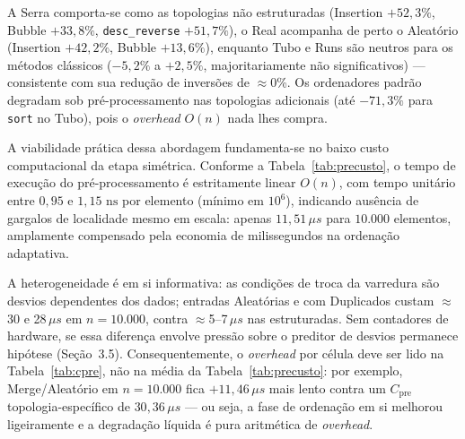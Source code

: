 \documentclass[portuguese]{sbc2025}%
\begin{document}
A Serra comporta-se como as topologias não estruturadas (Insertion $+52{,}3\%$, Bubble $+33{,}8\%$, \texttt{desc\_reverse} $+51{,}7\%$), o Real acompanha de perto o Aleatório (Insertion $+42{,}2\%$, Bubble $+13{,}6\%$), enquanto Tubo e Runs são neutros para os métodos clássicos ($-5{,}2\%$ a $+2{,}5\%$, majoritariamente não significativos) --- consistente com sua redução de inversões de $\approx$0\%. Os ordenadores padrão degradam sob pré-processamento nas topologias adicionais (até $-71{,}3\%$ para \texttt{sort} no Tubo), pois o \emph{overhead} $O(n)$ nada lhes compra.

A viabilidade prática dessa abordagem fundamenta-se no baixo custo computacional da etapa simétrica. Conforme a Tabela~\ref{tab:precusto}, o tempo de execução do pré-processamento é estritamente linear $O(n)$, com tempo unitário entre $0{,}95$ e $1{,}15\text{ ns}$ por elemento (mínimo em $10^6$), indicando ausência de gargalos de localidade mesmo em escala: apenas $11{,}51\,\mu s$ para $10.000$ elementos, amplamente compensado pela economia de milissegundos na ordenação adaptativa.

\begin{table}[htbp]
\centering
\caption{Custo médio do pré-processamento simétrico em função do tamanho do vetor (média sobre os tipos disponíveis, via ferramenta CLI, seed 42; Real apenas até $N{=}477.104$, logo ausente em $10^6$). O ponto $n{=}20{.}000$ foi incluído exclusivamente para caracterização da linearidade e não faz parte da matriz principal de tempos de ordenação. A média CLI difere da média do \emph{harness} Criterion (Tabela~\ref{tab:cpre}) por metodologia e cobertura distintas.}
\label{tab:precusto}

\end{table}

\begin{table}[htbp]
\centering
\caption{Custo isolado do pré-processamento $C_{\text{pre}}$ por topologia (mesmo harness Criterion da matriz de tempos; média, $\mu s$). A média CLI da Tabela~\ref{tab:precusto} esconde forte heterogeneidade: entradas não estruturadas (Aleatório, Duplicados) custam $\approx$5$\times$ mais que as estruturadas em $n{=}10.000$. Real não tem ponto em $10^6$ (teto do asset nativo).}
\label{tab:cpre}

\end{table}

A heterogeneidade é em si informativa: as condições de troca da varredura são desvios dependentes dos dados; entradas Aleatórias e com Duplicados custam $\approx$30 e 28\,$\mu s$ em $n{=}10.000$, contra $\approx$5--7\,$\mu s$ nas estruturadas. Sem contadores de hardware, se essa diferença envolve pressão sobre o preditor de desvios permanece hipótese (Seção~3.5). Consequentemente, o \emph{overhead} por célula deve ser lido na Tabela~\ref{tab:cpre}, não na média da Tabela~\ref{tab:precusto}: por exemplo, Merge/Aleatório em $n{=}10.000$ fica $+11{,}46\,\mu s$ mais lento contra um $C_{\text{pre}}$ topologia-específico de $30{,}36\,\mu s$ --- ou seja, a fase de ordenação em si melhorou ligeiramente e a degradação líquida é pura aritmética de \emph{overhead}.
\end{document}
